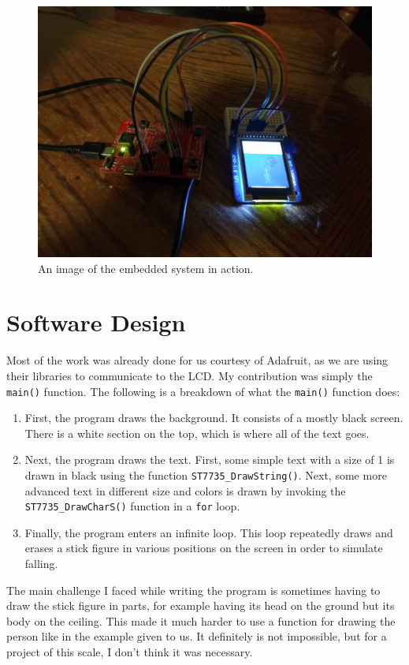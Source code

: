 \documentclass{article}
\renewcommand{\c}[1]{\texttt{#1}}
\begin{document}
\begin{figure}[H]
	\centering
	\includegraphics[width=\textwidth]{"Images/20211204_172654"}
	\caption{An image of the embedded system in action.}
	\label{image}
\end{figure}

\section{Software Design}
Most of the work was already done for us courtesy of
Adafruit, as we are using their libraries to communicate
to the LCD. My contribution was simply the \c{main()}
function. The following is a breakdown of what the
\c{main()} function does:
\begin{enumerate}
	\item First, the program draws the background. It
	consists of a mostly black screen. There is a white
	section on the top, which is where all of the text
	goes.
	\item Next, the program draws the text. First, some
	simple text with a size of 1 is drawn in black using
	the function \c{ST7735\_DrawString()}. Next, some
	more advanced text in different size and colors is
	drawn by invoking the \c{ST7735\_DrawCharS()} function
	in a \c{for} loop.
	\item Finally, the program enters an infinite loop.
	This loop repeatedly draws and erases a stick figure
	in various positions on the screen in order to
	simulate falling.
\end{enumerate}

The main challenge I faced while writing the program is
sometimes having to draw the stick figure
in parts, for example having its head on the ground
but its body on the ceiling. This made it much harder
to use a function for drawing the person like in the
example given to us. It definitely is not impossible, but
for a project of this scale, I don't think it was necessary.
\end{document}
